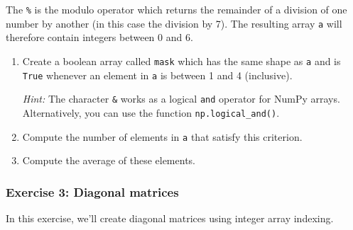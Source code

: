 \documentclass[10pt]{scrartcl}
\begin{document}
The \texttt{\%} is the modulo operator which returns the remainder of a
division of one number by another (in this case the division by 7). The
resulting array \texttt{a} will therefore contain integers between 0 and
6.

\begin{enumerate}
\def\labelenumi{\arabic{enumi}.}
\item
  Create a boolean array called \texttt{mask} which has the same shape
  as \texttt{a} and is \texttt{True} whenever an element in \texttt{a}
  is between 1 and 4 (inclusive).

  \emph{Hint:} The character \texttt{\&} works as a logical \texttt{and}
  operator for NumPy arrays. Alternatively, you can use the function
  \texttt{np.logical\_and()}.
\item
  Compute the number of elements in \texttt{a} that satisfy this
  criterion.
\item
  Compute the average of these elements.
\end{enumerate}

    \hypertarget{exercise-3-diagonal-matrices}{%
\subsubsection{Exercise 3: Diagonal
matrices}\label{exercise-3-diagonal-matrices}}

In this exercise, we'll create diagonal matrices using integer array
indexing.
\end{document}
